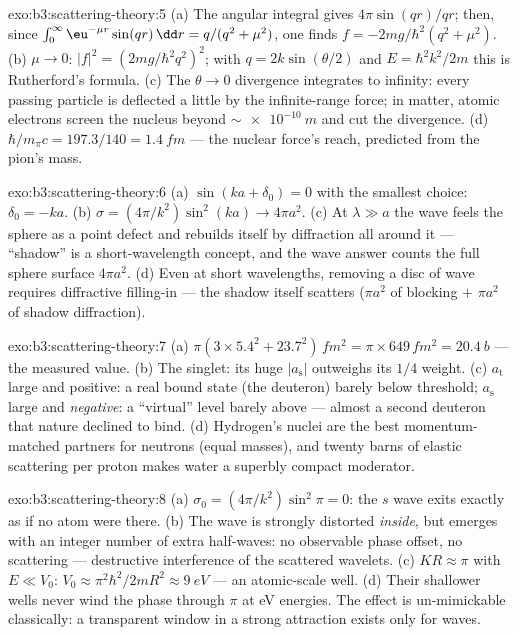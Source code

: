 \begin{solution}{exo:b3:scattering-theory:5}
(a) The angular integral gives $4\pi\sin(qr)/qr$; then, since
$\int_0^\infty\eu^{-\mu r}\sin(qr)\,\dd r = q/(q^2 + \mu^2)$,
one finds $f = -2mg/\hbar^2(q^2 + \mu^2)$. (b) $\mu \to 0$: $|f|^2 =
(2mg/\hbar^2q^2)^2$; with $q = 2k\sin(\theta/2)$ and $E =
\hbar^2k^2/2m$ this is Rutherford's formula. (c) The $\theta \to
0$ divergence integrates to infinity: every passing particle is
deflected a little by the infinite-range force; in matter, atomic
electrons screen the nucleus beyond $\sim\qty{e-10}{m}$ and cut
the divergence. (d) $\hbar/m_\pi c = 197.3/140 = \qty{1.4}{fm}$
--- the nuclear force's reach, predicted from the pion's mass.
\end{solution}

\begin{solution}{exo:b3:scattering-theory:6}
(a) $\sin(ka + \delta_0) = 0$ with the smallest choice: $\delta_0
= -ka$. (b) $\sigma = (4\pi/k^2)\sin^2(ka) \to 4\pi a^2$. (c) At
$\lambda \gg a$ the wave feels the sphere as a point defect and
rebuilds itself by diffraction all around it --- ``shadow'' is a
short-wavelength concept, and the wave answer counts the full
sphere surface $4\pi a^2$. (d) Even at short wavelengths,
removing a disc of wave requires diffractive filling-in --- the
shadow itself scatters ($\pi a^2$ of blocking $+$ $\pi a^2$ of
shadow diffraction).
\end{solution}

\begin{solution}{exo:b3:scattering-theory:7}
(a) $\pi(3 \times 5.4^2 + 23.7^2)\,\unit{fm^2} = \pi \times 649
\,\unit{fm^2} = \qty{20.4}{b}$ --- the measured value. (b) The
singlet: its huge $|a_{\text{s}}|$ outweighs its $1/4$ weight. (c)
$a_{\text{t}}$ large and positive: a real bound state (the
deuteron) barely below threshold; $a_{\text{s}}$ large and
\emph{negative}: a ``virtual'' level barely above --- almost a
second deuteron that nature declined to bind. (d) Hydrogen's
nuclei are the best momentum-matched partners for neutrons
(equal masses), and twenty barns of elastic scattering per proton
makes water a superbly compact moderator.
\end{solution}

\begin{solution}{exo:b3:scattering-theory:8}
(a) $\sigma_0 = (4\pi/k^2)\sin^2\pi = 0$: the $s$ wave exits
exactly as if no atom were there. (b) The wave is strongly
distorted \emph{inside}, but emerges with an integer number of
extra half-waves: no observable phase offset, no scattering ---
destructive interference of the scattered wavelets. (c) $KR
\approx \pi$ with $E \ll V_0$: $V_0 \approx \pi^2\hbar^2/2mR^2
\approx \qty{9}{eV}$ --- an atomic-scale well. (d) Their
shallower wells never wind the phase through $\pi$ at eV
energies. The effect is un-mimickable classically: a transparent
window in a strong attraction exists only for waves.
\end{solution}

